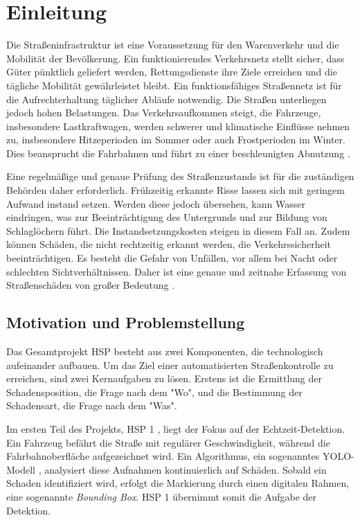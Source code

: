 \section{Einleitung}
\label{sec:einleitung}

Die Straßeninfrastruktur ist eine Voraussetzung für den Warenverkehr und die Mobilität der Bevölkerung. Ein funktionierendes Verkehrsnetz stellt sicher, dass Güter pünktlich geliefert werden, Rettungsdienste ihre Ziele erreichen und die tägliche Mobilität gewährleistet bleibt. Ein funktionsfähiges Straßennetz ist für die Aufrechterhaltung täglicher Abläufe notwendig. Die Straßen unterliegen jedoch hohen Belastungen. Das Verkehrsaufkommen steigt, die Fahrzeuge, insbesondere Lastkraftwagen, werden schwerer und klimatische Einflüsse nehmen zu, insbesondere Hitzeperioden im Sommer oder auch Frostperioden im Winter. Dies beansprucht die Fahrbahnen und führt zu einer beschleunigten Abnutzung \cite{bmv_erhaltung_2025}. 

Eine regelmäßige und genaue Prüfung des Straßenzustands ist für die zuständigen Behörden daher erforderlich. Frühzeitig erkannte Risse lassen sich mit geringem Aufwand instand setzen. Werden diese jedoch übersehen, kann Wasser eindringen, was zur Beeinträchtigung des Untergrunds und zur Bildung von Schlaglöchern führt. Die Instandsetzungskosten steigen in diesem Fall an. Zudem können Schäden, die nicht rechtzeitig erkannt werden, die Verkehrssicherheit beeinträchtigen. Es besteht die Gefahr von Unfällen, vor allem bei Nacht oder schlechten Sichtverhältnissen. Daher ist eine genaue und zeitnahe Erfassung von Straßenschäden von großer Bedeutung \cite{fraunhofer_ipm_strukturmerkmale_2026}. 

\subsection{Motivation und Problemstellung}
\label{subsec:motivation}

Das Gesamtprojekt HSP besteht aus zwei Komponenten, die technologisch aufeinander aufbauen. Um das Ziel einer automatisierten Straßenkontrolle zu erreichen, sind zwei Kernaufgaben zu lösen. Erstens ist die Ermittlung der Schadensposition, die Frage nach dem "Wo", und die Bestimmung der Schadensart, die Frage nach dem "Was".

Im ersten Teil des Projekts, HSP 1 \cite{hsp1_report}, liegt der Fokus auf der Echtzeit-Detektion. Ein Fahrzeug befährt die Straße mit regulärer Geschwindigkeit, während die Fahrbahnoberfläche aufgezeichnet wird. Ein Algorithmus, ein sogenanntes YOLO-Modell \cite{redmon2016you}, analysiert diese Aufnahmen kontinuierlich auf Schäden. Sobald ein Schaden identifiziert wird, erfolgt die Markierung durch einen digitalen Rahmen, eine sogenannte \emph{Bounding Box}. HSP 1 übernimmt somit die Aufgabe der Detektion.

